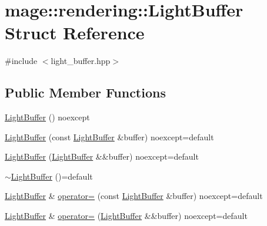 \hypertarget{structmage_1_1rendering_1_1_light_buffer}{}\section{mage\+:\+:rendering\+:\+:Light\+Buffer Struct Reference}
\label{structmage_1_1rendering_1_1_light_buffer}


{\ttfamily \#include $<$light\+\_\+buffer.\+hpp$>$}

\subsection*{Public Member Functions}
\begin{DoxyCompactItemize}
\item 
\hyperlink{structmage_1_1rendering_1_1_light_buffer_ad31355f44f8e31f540fa40c81e659fca}{Light\+Buffer} () noexcept
\item 
\hyperlink{structmage_1_1rendering_1_1_light_buffer_ae5f4964ae3773e590a8fe07e3b6bcdfa}{Light\+Buffer} (const \hyperlink{structmage_1_1rendering_1_1_light_buffer}{Light\+Buffer} \&buffer) noexcept=default
\item 
\hyperlink{structmage_1_1rendering_1_1_light_buffer_a016cbba8dd68da2f80a7018e2276070d}{Light\+Buffer} (\hyperlink{structmage_1_1rendering_1_1_light_buffer}{Light\+Buffer} \&\&buffer) noexcept=default
\item 
\hyperlink{structmage_1_1rendering_1_1_light_buffer_a36fd7699f61cde6359d6934428eb9daf}{$\sim$\+Light\+Buffer} ()=default
\item 
\hyperlink{structmage_1_1rendering_1_1_light_buffer}{Light\+Buffer} \& \hyperlink{structmage_1_1rendering_1_1_light_buffer_a409af50e3d21571e56b36c6c88769a65}{operator=} (const \hyperlink{structmage_1_1rendering_1_1_light_buffer}{Light\+Buffer} \&buffer) noexcept=default
\item 
\hyperlink{structmage_1_1rendering_1_1_light_buffer}{Light\+Buffer} \& \hyperlink{structmage_1_1rendering_1_1_light_buffer_abe8ee3df1e5c2ce28aaab03ce729a184}{operator=} (\hyperlink{structmage_1_1rendering_1_1_light_buffer}{Light\+Buffer} \&\&buffer) noexcept=default
\end{DoxyCompactItemize}

